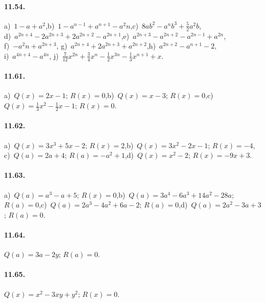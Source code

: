 \paragraph{11.54.} a)~$1-a+a^{2}$,\quad b)~$1-a^{n-1}+a^{n+1}-a^{2}n$,\quad c)~$8ab^2-a^nb^3+\frac{5}{2}a^2b$, \protect\\
d)~$a^{2n+4}-2a^{2n+3}+2a^{2n+2}-a^{2n+1}$,\quad e)~$a^{2n+3}-a^{2n+2}-a^{2n-1}+a^{2n}$,\protect\\ f)~$-a^{2}n+a^{2n+3}$,\quad
g)~$a^{2n+4}+2a^{2n+3}+a^{2n+2}$,\quad h)~$a^{2n+2}-a^{n+1}-2$,\protect\\ i)~$a^{4n+4}-a^{4n}$,\quad
j)~$\frac{7}{12}x^{2n}+\frac{3}{4}x^{n}-\frac{1}{2}x^{3n}-\frac{1}{3}x^{n+1}+x$.
\paragraph{11.61.}
a)~$Q(x)=2x-1$; $R(x)=0$,\quad b)~$Q(x)=x-3$; $R(x)=0$,\quad c)~$Q(x)=\frac{1}{3}x^{2}-\frac{1}{2}x-1$; $R(x)=0$.
\paragraph{11.62.}
a)~$Q(x)=3x^{3}+5x-2$; $R(x)=2$,\quad b)~$Q(x)=3x^{2}-2x-1$; $R(x)=-4$,\protect\\ c)~$Q(a)=2a+4$; $R(a)=-a^{2}+1$,\quad d)~$Q(x)=x^{2}-2$; $R(x)=-9x+3$.
\paragraph{11.63.}
a)~$Q(a)=a^{3}-a+5$; $R(x)=0$,\quad b)~$Q(a)=3a^{4}-6a^{3}+14a^{2}-28a$; $R(a)=0$,\quad c)~$Q(a)=2a^{3}-4a^{2}+6a-2$; $R(a)=0$,\quad d)~$Q(a)=2a^{2}-3a+3$; $R(a)=0$.
\paragraph{11.64.}
$Q(a)=3a-2y$; $R(a)=0$.
\paragraph{11.65.}
$Q(x)=x^{2}-3xy+y^{2}$; $R(x)=0$.